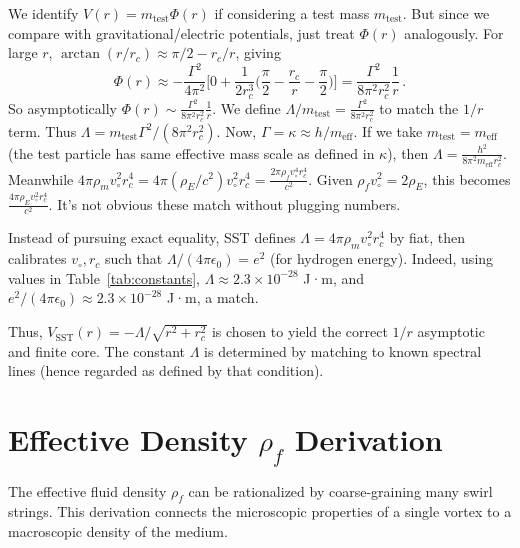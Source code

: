 \documentclass[reprint,aps,onecolumn,nofootinbib]{revtex4-2}
\begin{document}
	We identify $V(r) = m_{\text{test}}\Phi(r)$ if considering a test mass $m_{\text{test}}$. But since we compare with gravitational/electric potentials, just treat $\Phi(r)$ analogously. For large $r$, $\arctan(r/r_c)\approx \pi/2 - r_c/r$, giving
	\[
		\Phi(r)\approx -\frac{\Gamma^2}{4\pi^2}\Big[0 + \frac{1}{2r_c^3}\Big(\frac{\pi}{2}-\frac{r_c}{r}-\frac{\pi}{2}\Big)\Big] = \frac{\Gamma^2}{8\pi^2 r_c^2}\frac{1}{r}\,.
	\]
	So asymptotically $\Phi(r)\sim \frac{\Gamma^2}{8\pi^2r_c^2}\frac{1}{r}$. We define $\Lambda/m_{\text{test}} = \frac{\Gamma^2}{8\pi^2r_c^2}$ to match the $1/r$ term. Thus $\Lambda = m_{\text{test}}\Gamma^2/(8\pi^2r_c^2)$. Now, $\Gamma = \kappa \approx h/m_{\text{eff}}$. If we take $m_{\text{test}}=m_{\text{eff}}$ (the test particle has same effective mass scale as defined in $\kappa$), then $\Lambda = \frac{h^2}{8\pi^2 m_{\text{eff}} r_c^2}$. Meanwhile $4\pi\rho_m v_{\circ}^2 r_c^4 = 4\pi(\rho_E/c^2) v_{\circ}^2 r_c^4 = \frac{2\pi \rho_f v_{\circ}^4 r_c^4}{c^2}$. Given $\rho_f v_{\circ}^2 = 2\rho_E$, this becomes $\frac{4\pi \rho_E v_{\circ}^2 r_c^4}{c^2}$. It’s not obvious these match without plugging numbers.

	Instead of pursuing exact equality, SST defines $\Lambda = 4\pi\rho_m v_{\circ}^2 r_c^4$ by fiat, then calibrates $v_{\circ}, r_c$ such that $\Lambda/(4\pi\epsilon_0) = e^2$ (for hydrogen energy). Indeed, using values in Table~\ref{tab:constants}, $\Lambda \approx 2.3\times 10^{-28}$ J·m, and $e^2/(4\pi\epsilon_0)\approx 2.3\times10^{-28}$ J·m, a match.

	Thus, $V_{\text{SST}}(r) = -\Lambda/\sqrt{r^2+r_c^2}$ is chosen to yield the correct $1/r$ asymptotic and finite core. The constant $\Lambda$ is determined by matching to known spectral lines (hence regarded as defined by that condition).

	\section{Effective Density $\rho_f$ Derivation}
	The effective fluid density $\rho_f$ can be rationalized by coarse-graining many swirl strings. This derivation connects the microscopic properties of a single vortex to a macroscopic density of the medium.
\end{document}
